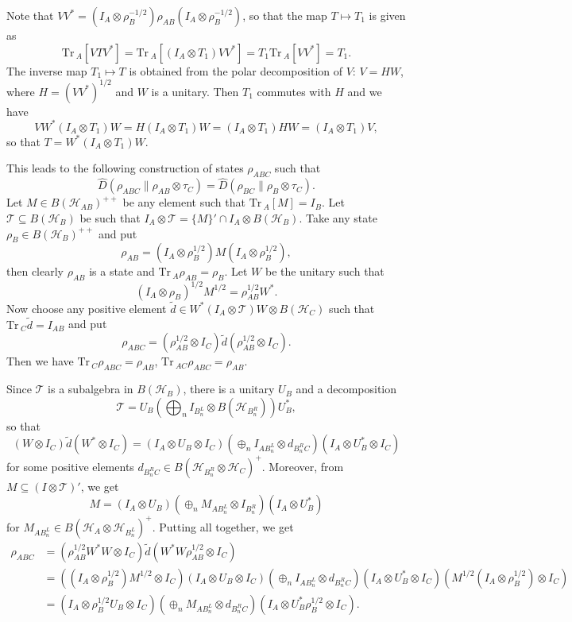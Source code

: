 \documentclass[12pt]{article}
\theoremstyle{definition}
\theoremstyle{remark}
\def\Te{\mathcal T}
\def\Ha{\mathcal H}
\def \Tr{\mathrm{Tr}\,}
\begin{document}
Note that $VV^*=(I_A\otimes \rho_B^{-1/2})\rho_{AB}(I_A\otimes \rho_B^{-1/2})$, so that
the map $T\mapsto T_1$ is given as
\[
\Tr_A [VTV^*]=\Tr_A[(I_A\otimes T_1)VV^*]=T_1\Tr_A [VV^*]=T_1.
\]
The inverse map $T_1\mapsto T$ is obtained from the polar decomposition of $V$: $V=HW$,
where $H=(VV^*)^{1/2}$ and $W$ is a unitary. Then $T_1$ commutes with $H$ and we have
\[
VW^*(I_A\otimes T_1)W=H(I_A\otimes T_1)W=(I_A\otimes T_1)HW=(I_A\otimes T_1)V,
\]
so that $T=W^*(I_A\otimes T_1)W$. 

This leads to the following construction of states $\rho_{ABC}$ such that 
\[
\hat D(\rho_{ABC}\|\rho_{AB}\otimes \tau_C)=\hat D(\rho_{BC}\|\rho_B\otimes  \tau_C).
\]
Let $M\in B(\Ha_{AB})^{++}$ be any element such that $\Tr_A[M]=I_B$.  Let $\Te\subseteq
B(\Ha_B)$ be such that $I_A\otimes \Te=\{M\}'\cap I_A\otimes B(\Ha_B)$. Take any state
$\rho_B\in B(\Ha_B)^{++}$ and put
\[
\rho_{AB}=(I_A\otimes \rho_B^{1/2})M(I_A\otimes \rho_B^{1/2}),
\]
then clearly $\rho_{AB}$ is a state and $\Tr_A \rho_{AB}=\rho_B$. Let $W$ be the unitary such that 
\[
(I_A\otimes \rho_B)^{1/2}M^{1/2}=\rho_{AB}^{1/2}W^*.
\]
Now choose any positive  element $\tilde d\in W^*(I_A\otimes \Te)W\otimes B(\Ha_C)$ such
that $\Tr_C \tilde d=I_{AB}$ and put 
\[
\rho_{ABC}=(\rho_{AB}^{1/2}\otimes I_C)\tilde d (\rho_{AB}^{1/2}\otimes I_C).
\]
Then we have $\Tr_C \rho_{ABC}=\rho_{AB}$, $\Tr_{AC}\rho_{ABC}=\rho_{AB}$.

Since $\Te$ is a subalgebra in $B(\Ha_B)$, there is a unitary $U_B$ and a decomposition
\[
\Te=U_B\left(\bigoplus_n I_{B^L_n}\otimes B(\Ha_{B^R_n})\right) U_B^*,
\]
so that 
\[
(W\otimes I_C)\tilde d(W^*\otimes I_C)=(I_A\otimes U_B\otimes I_C)\left(\oplus_n I_{AB^L_n}\otimes
d_{B^R_nC}\right)(I_A\otimes U_B^*\otimes I_C)
\]
for some positive elements $d_{B^R_nC}\in B(\Ha_{B^R_n}\otimes \Ha_C)^+$.
Moreover, from  $M\subseteq (I\otimes \Te)'$, we get
\[
M=(I_A\otimes U_B)\left(\oplus_n M_{AB^L_n}\otimes I_{B^R_n}\right)(I_A\otimes U_B^*)
\]
for $M_{AB^L_n}\in B(\Ha_A\otimes \Ha_{B^L_n})^+$. 
Putting all together, we get
\begin{align*}
\rho_{ABC}&=(\rho_{AB}^{1/2}W^*W\otimes I_C)\tilde d (W^*W\rho_{AB}^{1/2}\otimes
I_C)\\ &=((I_A\otimes \rho_B^{1/2})M^{1/2}\otimes I_C)(I_A\otimes U_B\otimes I_C)\left(\oplus_n I_{AB^L_n}\otimes
d_{B^R_nC}\right)(I_A\otimes U_B^*\otimes I_C)(M^{1/2}(I_A\otimes \rho_B^{1/2})\otimes
I_C)\\
&= (I_A\otimes \rho_B^{1/2}U_B\otimes I_C)\left(\oplus_n M_{AB^L_n}\otimes
d_{B^R_nC}\right)(I_A\otimes U_B^*\rho_B^{1/2}\otimes I_C). 
\end{align*}
\end{document}
